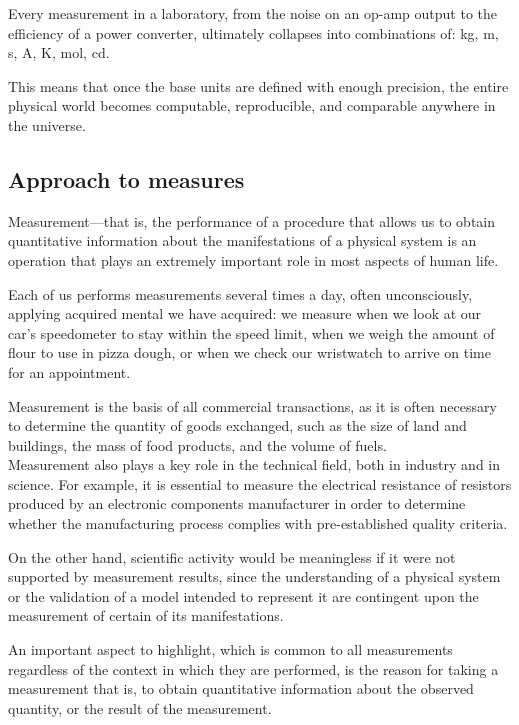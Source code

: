 \documentclass[../main.tex]{subfiles}
\begin{document}
Every measurement in a laboratory, from the noise on an op-amp output to the efficiency of a power converter, ultimately collapses into combinations of: kg, m, s, A, K, mol, cd.

This means that once the base units are defined with enough precision, the entire physical world becomes computable, reproducible, and comparable anywhere in the universe.

\subsection{Approach to measures}

Measurement—that is, the performance of a procedure that allows us to obtain quantitative information about the manifestations of a physical system is an operation that plays an extremely important role in most aspects of human life. 

Each of us performs measurements several times a day, often unconsciously, applying acquired mental we have acquired: we measure when we look at our car’s speedometer to stay within the speed limit, when we weigh the amount of flour to use in pizza dough, or when we check our wristwatch to arrive on time for an appointment.

Measurement is the basis of all commercial transactions, as it is often necessary to determine the quantity of goods exchanged, such as the size of land and buildings, the mass of food products, and the volume of fuels.\\

Measurement also plays a key role in the technical field, both in industry and in science. For example, it is essential to measure the electrical resistance of resistors produced by an electronic components manufacturer in order to determine whether the manufacturing process complies with pre-established quality criteria. 

On the other hand, scientific activity would be meaningless if it were not supported by measurement results, since the understanding of a physical system or the validation of a model intended to represent it are contingent upon the measurement of certain of its manifestations.

An important aspect to highlight, which is common to all measurements regardless of the context in which they are performed, is the reason for taking a measurement that is, to obtain quantitative information about the observed quantity, or the result of the measurement. 
\end{document}
